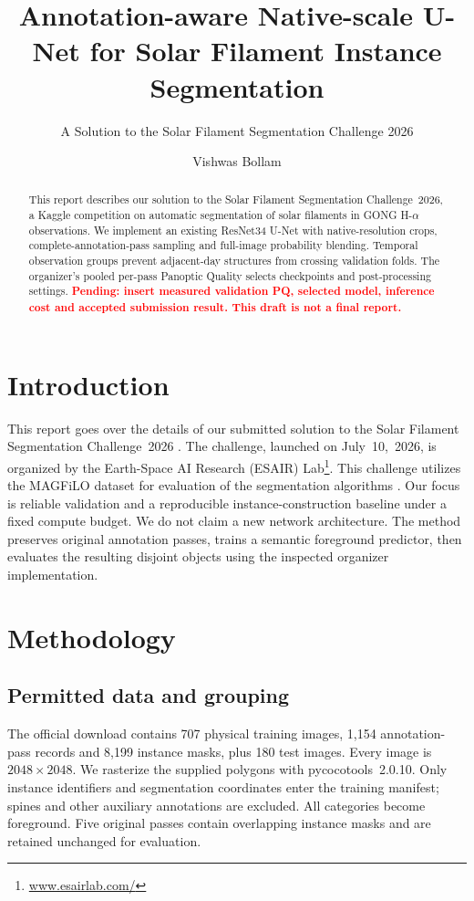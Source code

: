 \documentclass[sigconf]{acmart}
\newcommand{\pending}[1]{\textcolor{red}{\textbf{Pending: #1}}}
\begin{document}
\title{Annotation-aware Native-scale U-Net for Solar Filament Instance Segmentation}
\subtitle{A Solution to the Solar Filament Segmentation Challenge 2026}
\author{Vishwas Bollam}
\begin{abstract}
This report describes our solution to the Solar Filament Segmentation Challenge~2026, a Kaggle competition on automatic segmentation of solar filaments in GONG H-$\alpha$ observations.
We implement an existing ResNet34 U-Net with native-resolution crops, complete-annotation-pass sampling and full-image probability blending. Temporal observation groups prevent adjacent-day structures from crossing validation folds. The organizer's pooled per-pass Panoptic Quality selects checkpoints and post-processing settings. \pending{insert measured validation PQ, selected model, inference cost and accepted submission result. This draft is not a final report.}
\end{abstract}
\maketitle

\section{Introduction}
This report goes over the details of our submitted solution to the Solar Filament Segmentation Challenge~2026 \cite{filament-segmentation-2026}. The challenge, launched on July~10,~2026, is organized by the Earth-Space AI Research (ESAIR) Lab\footnote{\href{https://www.esairlab.com/home}{www.esairlab.com/}}. This challenge utilizes the MAGFiLO dataset for evaluation of the segmentation algorithms \cite{ahmadzadeh2024dataset}.
Our focus is reliable validation and a reproducible instance-construction baseline under a fixed compute budget. We do not claim a new network architecture. The method preserves original annotation passes, trains a semantic foreground predictor, then evaluates the resulting disjoint objects using the inspected organizer implementation.

\section{Methodology}\label{sec:methodology}
\subsection{Permitted data and grouping}
The official download contains 707 physical training images, 1,154 annotation-pass records and 8,199 instance masks, plus 180 test images. Every image is $2048\times2048$. We rasterize the supplied polygons with pycocotools~2.0.10. Only instance identifiers and segmentation coordinates enter the training manifest; spines and other auxiliary annotations are excluded. All categories become foreground. Five original passes contain overlapping instance masks and are retained unchanged for evaluation.
\end{document}
